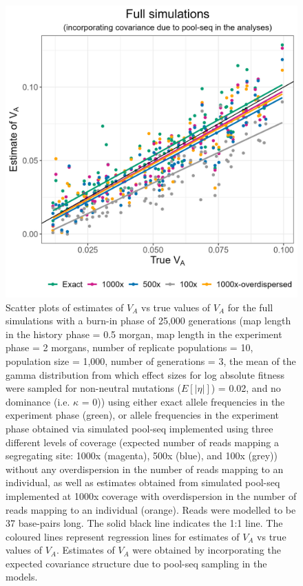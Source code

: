 \documentclass[12pt]{article}
\begin{document}
\begin{bibunit}
\begin{figure}[H]
\centering
\includegraphics[scale = 0.15]{Figures/poolseq_full.jpg}
\caption{Scatter plots of estimates of $V_A$ vs true values of $V_A$ for the full simulations with a burn-in phase of 25,000 generations (map length in the history phase = 0.5 morgan, map length in the experiment phase = 2 morgans, number of replicate populations = 10, population size = 1,000, number of generations = 3, the mean of the gamma distribution from which effect sizes for log absolute fitness were sampled for non-neutral mutations ($E[|\eta|]$) = 0.02, and no dominance (i.e. $\kappa$ = 0)) using either exact allele frequencies in the experiment phase (green), or allele frequencies in the experiment phase obtained via simulated pool-seq implemented using three different levels of coverage (expected number of reads mapping a segregating site: 1000x (magenta), 500x (blue), and 100x (grey)) without any overdispersion in the number of reads mapping to an individual, as well as estimates obtained from simulated pool-seq implemented at 1000x coverage with overdispersion in the number of reads mapping to an individual (orange). Reads were modelled to be 37 base-pairs long. The solid black line indicates the 1:1 line. The coloured lines represent regression lines for estimates of $V_A$ vs true values of $V_A$. Estimates of $V_A$ were obtained by incorporating the expected covariance structure due to pool-seq sampling in the models.}
  \label{fig:poolseq_full}
\end{figure}

\putbib
\end{bibunit}




\end{document}
